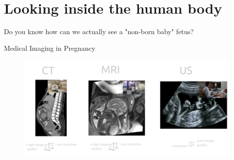 \section{Looking inside the human body}




{
\begin{frame}{}

\BigSizeFont
Do you know how can we actually see a "non-born baby" fetus?

\end{frame}
}







{
\begin{frame}{Medical Imaging in Pregnancy}
      \begin{figure}
        \centering
        \includegraphics[width=1.0\textwidth]{./figures/medical-imaging-in-pregnancy/ct-mr-us/versions/drawing-v02.png}
      \end{figure}
\end{frame}
}



